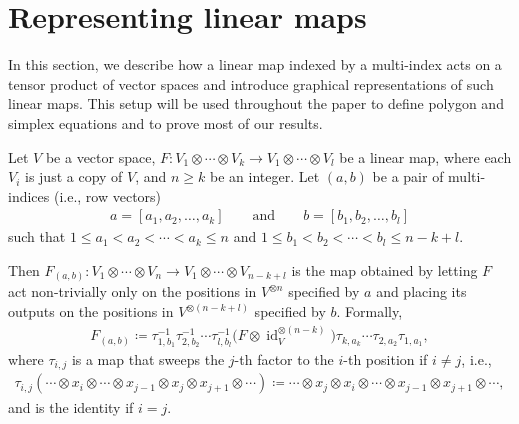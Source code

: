 \documentclass[10pt,a4paper]{amsart}
\numberwithin{equation}{section}
\theoremstyle{definition}
\begin{document}
\section{Representing linear maps}\label{sec:representing_linear_maps}

In this section, we describe how a linear map indexed by a multi-index acts on a tensor product of vector spaces and introduce graphical representations of such linear maps. This setup will be used throughout the paper to define polygon and simplex equations and to prove most of our results.


Let $V$ be a vector space, $F\colon V_1\otimes \cdots \otimes V_k\to V_1\otimes \cdots \otimes V_l$ be a linear map, where each $V_i$ is just a copy of $V$, and $n\geq k$ be an integer.
Let $(a,b)$ be a pair of multi-indices (i.e., row vectors)
\begin{align*}
 a=[ a_{1},a_{2},\dots, a_{k} ]\qquad \text{and} \qquad b=[ b_{1},b_{2},\dots, b_{l} ]
\end{align*}
such that $1\le a_1<a_2<\cdots<a_k\le n$ and $1\le b_1<b_2<\cdots< b_l\le n-k+l$.

Then $F_{(a,b)}\colon V_1\otimes \cdots \otimes V_n\to V_1\otimes \cdots \otimes V_{n-k+l}$ is the map obtained by letting $F$ act non-trivially only on the positions in $V^{\otimes n}$ specified by $a$ and placing its outputs on the positions in $V^{\otimes (n-k+l)}$ specified by $b$.
Formally, \begin{align*}
 F_{(a,b)}\coloneqq\tau_{1,b_1}^{-1} \tau_{2,b_2}^{-1} \cdots \tau_{l,b_l}^{-1}\bigl(F\otimes\operatorname{id}_V^{\otimes{(n-k)}}\bigr) \tau_{k,a_k} \cdots \tau_{2,a_2} \tau_{1,a_1},
\end{align*}
where $\tau_{i,j}$ is a map that sweeps the $j$-th factor to the $i$-th position if $i\ne j$, i.e.,
\begin{align*}
 \tau_{i,j}(\cdots \otimes x_i \otimes \cdots \otimes x_{j-1} \otimes x_j \otimes x_{j+1}\otimes \cdots ) \coloneqq \cdots \otimes x_{j} \otimes x_{i} \otimes \cdots \otimes x_{j-1} \otimes x_{j+1}\otimes\cdots,
\end{align*}
and is the identity if $i=j$.
\end{document}
